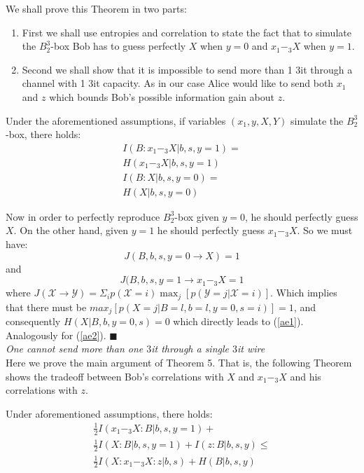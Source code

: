 We shall prove this Theorem in two parts:
\begin{enumerate}
\item First we shall use entropies and correlation to state the fact that to simulate the $B^3_2$-box Bob has to guess perfectly $X$ when $y=0$ and $x_1-_3X$ when $y=1$. 
\item Second we shall show that it is impossible to send more than 1 $3$it through a channel with 1 $3$it capacity. As in our case Alice would like to send both $x_1$ and $z$ which bounds Bob's possible information gain about $z$. 
\end{enumerate}
\begin{mydef2}
Under the aforementioned assumptions, if variables $(x_1,y,X,Y)$ simulate the $B^3_2$-box, there holds:
\begin{eqnarray} \label{ae1}
I(B:x_1-_3X|b,s,y=1)=\nonumber \\H(x_1-_3X|b,s,y=1) \\ \label{ae2}
I(B:X|b,s,y=0)=\nonumber \\ H(X|b,s,y=0) 
\end{eqnarray}
\end{mydef2}
Now in order to perfectly reproduce $B^3_2$-box given $y=0$, he should perfectly guess $X$. On the other hand, given $y=1$ he should perfectly guess $x_1-_3X$. So we must have:
\begin{equation}
J(B,b,s,y=0\rightarrow X)=1 
\end{equation}
and
\begin{equation}
J(B,b,s,y=1\rightarrow x_1-_3X=1 
\end{equation}
where $J(\mathcal{X} \rightarrow \mathcal{Y})=\Sigma_ip(\mathcal{X}=i)\max_j[p(\mathcal{Y}=j|\mathcal{X}=i)]$. Which implies that there must be $max_j[p(X=j|B=l,b=l,y=0,s=i)]=1$, and consequently $H(X|B,b,y=0,s)=0$ which directly leads to (\ref{ae1}). Analogously for (\ref{ae2}). $\blacksquare$\\
\textit{One cannot send more than one $3$it through a single $3$it wire}\\
Here we prove the main argument of Theorem 5. That is, the following Theorem shows the tradeoff between Bob's correlations with $X$ and $x_1-_3X$ and his correlations with $z$. 
\begin{mydef1} \label{At2}
Under aforementioned assumptions, there holds:
\begin{eqnarray} \label{pe1}
\frac{1}{2}I(x_1-_3X:B|b,s,y=1)+\nonumber \\ \frac{1}{2}I(X:B|b,s,y=1)+I(z:B|b,s,y) \leq \nonumber \\ 
\frac{1}{2}I(X:x_1-_3X:z|b,s)+H(B|b,s,y)
\end{eqnarray}
\end{mydef1}
